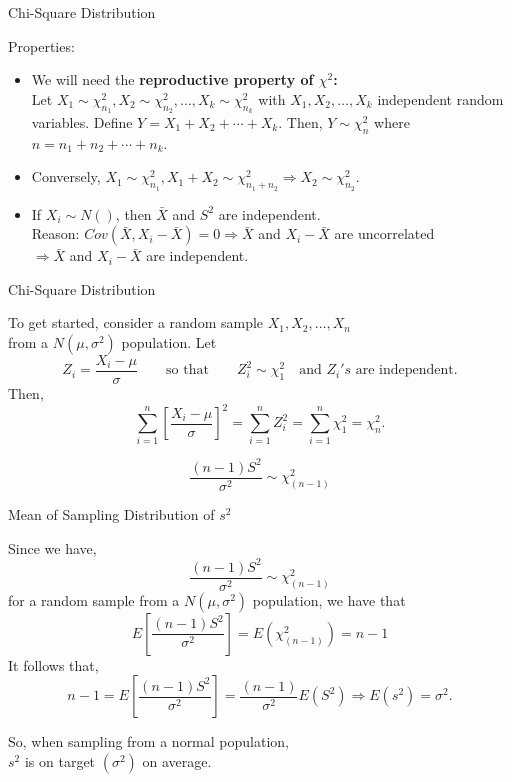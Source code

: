 \documentclass{beamer}\usepackage[]{graphicx}\usepackage[]{color}
\begin{document}
\begin{frame}{Chi-Square Distribution}

Properties:
\begin{itemize}
\item
We will need the {\bf reproductive property of $\chi^2$:}\\ \pause
Let $X_1\sim\chi^2_{n_1}, X_2\sim\chi^2_{n_2}, \ldots,
X_k\sim\chi^2_{n_k}$
with $X_1, X_2,\ldots,X_k$ independent random variables.
Define $Y=X_1+X_2+\cdots+X_k.$
Then, $Y\sim\chi^2_n$ where $n=n_1+n_2+\cdots+n_k.$ \pause
\item
Conversely, $X_1\sim\chi^2_{n_1}, X_1 + X_2\sim\chi^2_{n_1 + n_2} \Rightarrow X_2\sim\chi^2_{n_2}$. \pause 
\item
If $X_i \sim N()$, then $\bar{X}$ and $S^2$ are independent. \\ \pause
Reason: $Cov(\bar{X}, X_i - \bar{X}) = 0 \Rightarrow \bar{X}$ and $X_i - \bar{X}$ are uncorrelated\\
$\Rightarrow \bar{X}$ and  $X_i - \bar{X}$ are independent. 

\end{itemize}

\end{frame}

\begin{frame}{Chi-Square Distribution}

To get started, consider a random sample $X_1, X_2,\ldots,X_n$\\
 from a $N(\mu,\sigma^2)$ population. \pause
Let $$Z_i = \frac{X_i-\mu}{\sigma} \qquad\mbox{so that}\qquad
Z_i^2\sim\chi^2_1 \quad\mbox{and\ } Z_i's \mbox{\ are independent.}$$ \pause
Then, 
$$\sum_{i=1}^n \left[\frac{X_i-\mu}{\sigma}\right]^2 
  = \sum_{i=1}^n Z_i^2 = \sum_{i=1}^n \chi^2_1 = \chi^2_n.$$ \pause


$$\frac{(n-1)S^2}{\sigma^2}\sim\chi^2_{(n-1)}$$

\end{frame}

\begin{frame}{Mean of Sampling Distribution of $s^2$}

Since we have,
$$\frac{(n-1)S^2}{\sigma^2}\sim\chi^2_{(n-1)}$$ for a random sample from a
$N(\mu,\sigma^2)$ population, we have that
$$E\left[\frac{(n-1)S^2}{\sigma^2}\right] 
= E(\chi^2_{(n-1)}) = n-1$$ \pause
It follows that, $$n-1 = E\left[\frac{(n-1)S^2}{\sigma^2}\right]
          = \frac{(n-1)}{\sigma^2}E(S^2) \Rightarrow
E(s^2)=\sigma^2.$$

So, when sampling from a normal population, \\
$s^2$ is on target $(\sigma^2)$ on average.
\bigskip



\end{frame}
\end{document}
